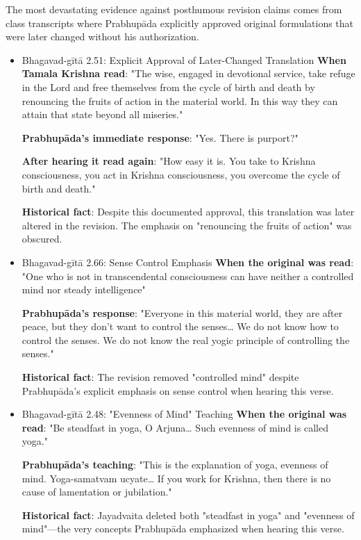 \documentclass[11pt,twoside]{book}
\begin{document}
The most devastating evidence against posthumous revision claims comes from class transcripts where Prabhupāda explicitly approved original formulations that were later changed without his authorization.
\begin{itemize}
\item Bhagavad-gītā 2.51: Explicit Approval of Later-Changed Translation
\label{sec:orgd990b6a}
\textbf{\textbf{When Tamala Krishna read}}: "The wise, engaged in devotional service, take refuge in the Lord and free themselves from the cycle of birth and death by renouncing the fruits of action in the material world. In this way they can attain that state beyond all miseries."

\textbf{\textbf{Prabhupāda's immediate response}}: "Yes. There is purport?"

\textbf{\textbf{After hearing it read again}}: "How easy it is. You take to Krishna consciousness, you act in Krishna consciousness, you overcome the cycle of birth and death."

\textbf{\textbf{Historical fact}}: Despite this documented approval, this translation was later altered in the revision. The emphasis on "renouncing the fruits of action" was obscured.
\item Bhagavad-gītā 2.66: Sense Control Emphasis
\label{sec:org1031ad2}
\textbf{\textbf{When the original was read}}: "One who is not in transcendental consciousness can have neither a controlled mind nor steady intelligence"

\textbf{\textbf{Prabhupāda's response}}: "Everyone in this material world, they are after peace, but they don't want to control the senses\ldots{} We do not know how to control the senses. We do not know the real yogic principle of controlling the senses."

\textbf{\textbf{Historical fact}}: The revision removed "controlled mind" despite Prabhupāda's explicit emphasis on sense control when hearing this verse.
\item Bhagavad-gītā 2.48: "Evenness of Mind" Teaching
\label{sec:orgae12c74}
\textbf{\textbf{When the original was read}}: "Be steadfast in yoga, O Arjuna\ldots{} Such evenness of mind is called yoga."

\textbf{\textbf{Prabhupāda's teaching}}: "This is the explanation of yoga, evenness of mind. Yoga-samatvam ucyate\ldots{} If you work for Krishna, then there is no cause of lamentation or jubilation."

\textbf{\textbf{Historical fact}}: Jayadvaita deleted both "steadfast in yoga" and "evenness of mind"—the very concepts Prabhupāda emphasized when hearing this verse.
\end{itemize}
\end{document}
